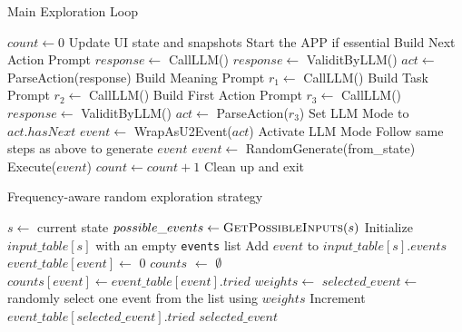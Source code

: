 \documentclass[
	letterpaper, %
	10pt, %
]{article} %
\begin{document}
\begin{algorithm}
\caption{Main Exploration Loop}
\begin{algorithmic}[1]
  \State $count \gets 0$
    \State Update UI state and snapshots
    \State Start the APP if essential
          \State Build Next Action Prompt
          \State $response \gets$ CallLLM()
          \State $response \gets$ ValiditByLLM()
          \State $act \gets$ ParseAction(response)
        \Else
          \State Build Meaning Prompt
          \State $r_1 \gets$ CallLLM()
          \State Build Task Prompt
          \State $r_2 \gets$ CallLLM()
          \State Build First Action Prompt
          \State $r_3 \gets$ CallLLM()
          \State $response \gets$ ValiditByLLM()
          \State $act \gets$ ParseAction($r_3$)
        \EndIf
        \State Set LLM Mode to $act.hasNext$
        \State $event \gets$ WrapAsU2Event($act$)
        \State Activate LLM Mode
        \State Follow same steps as above to generate $event$
      \Else
        \State $event \gets$ RandomGenerate(from\_state)
        \EndIf
    \State Execute($event$)
    \State $count \gets count + 1$
  \EndWhile
  \State Clean up and exit
\EndFunction
\end{algorithmic}
\end{algorithm}

\begin{algorithm}
\caption{Frequency-aware random exploration strategy}
\begin{algorithmic}[1]
\State $s \gets$ current state
    \State $possible\_events \gets \Call{GetPossibleInputs}{s}$
    \State Initialize $input\_table[s]$ with an empty \texttt{events} list
        \State Add $event$ to $input\_table[s].events$
            \State $event\_table[event] \gets$ 0
        \EndIf
    \EndFor
\EndIf
    \State $counts$ $\gets$ $\emptyset$
        \State $counts[event] \gets event\_table[event].tried$
    \EndFor
    \State $weights \gets$ 
    \State $selected\_event \gets$ randomly select one event from the list using $weights$
    \State Increment $event\_table[selected\_event].tried$
    \State \Return $selected\_event$
\end{algorithmic}
\end{algorithm}
\end{document}

